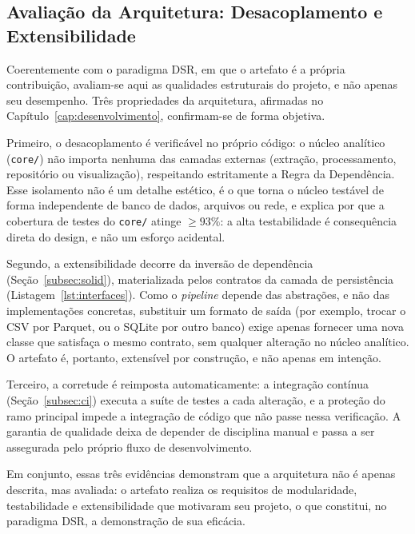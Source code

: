\documentclass[
      12pt,
      a4paper,
      openright,
      oneside,
      chapter=TITLE,
      section=TITLE,
      english,
      french,
      spanish,
      brazilian
    ]{abntex2}
\begin{document}
    \subsection{Avaliação da Arquitetura: Desacoplamento e Extensibilidade}

    Coerentemente com o paradigma DSR, em que o artefato é a própria contribuição, avaliam-se aqui as qualidades estruturais do projeto, e não apenas seu desempenho. Três propriedades da arquitetura, afirmadas no Capítulo~\ref{cap:desenvolvimento}, confirmam-se de forma objetiva.

    Primeiro, o desacoplamento é verificável no próprio código: o núcleo analítico (\texttt{core/}) não importa nenhuma das camadas externas (extração, processamento, repositório ou visualização), respeitando estritamente a Regra da Dependência. Esse isolamento não é um detalhe estético, é o que torna o núcleo testável de forma independente de banco de dados, arquivos ou rede, e explica por que a cobertura de testes do \texttt{core/} atinge $\geq 93\%$: a alta testabilidade é consequência direta do design, e não um esforço acidental.

    Segundo, a extensibilidade decorre da inversão de dependência (Seção~\ref{subsec:solid}), materializada pelos contratos da camada de persistência (Listagem~\ref{lst:interfaces}). Como o \textit{pipeline} depende das abstrações, e não das implementações concretas, substituir um formato de saída (por exemplo, trocar o CSV por Parquet, ou o SQLite por outro banco) exige apenas fornecer uma nova classe que satisfaça o mesmo contrato, sem qualquer alteração no núcleo analítico. O artefato é, portanto, extensível por construção, e não apenas em intenção.

    Terceiro, a corretude é reimposta automaticamente: a integração contínua (Seção~\ref{subsec:ci}) executa a suíte de testes a cada alteração, e a proteção do ramo principal impede a integração de código que não passe nessa verificação. A garantia de qualidade deixa de depender de disciplina manual e passa a ser assegurada pelo próprio fluxo de desenvolvimento.

    Em conjunto, essas três evidências demonstram que a arquitetura não é apenas descrita, mas avaliada: o artefato realiza os requisitos de modularidade, testabilidade e extensibilidade que motivaram seu projeto, o que constitui, no paradigma DSR, a demonstração de sua eficácia.
\end{document}
